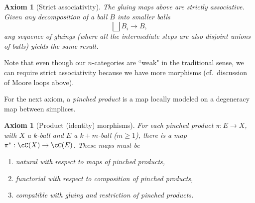 \documentclass{pnastwo}
\newtheorem{axiom}[prop]{Axiom}
\begin{document}
\begin{article}
\begin{axiom}[Strict associativity] \label{nca-assoc}\label{axiom:associativity}
The gluing maps above are strictly associative.
Given any decomposition of a ball $B$ into smaller balls
$$\bigsqcup B_i \to B,$$ 
any sequence of gluings (where all the intermediate steps are also disjoint unions of balls) yields the same result.
\end{axiom}
Note that even though our $n$-categories are ``weak" in the traditional sense, we can require
strict associativity because we have more morphisms (cf.\ discussion of Moore loops above).

For the next axiom, a \emph{pinched product} is a map locally modeled on a degeneracy map between simplices.
\begin{axiom}[Product (identity) morphisms]
\label{axiom:product}
For each pinched product $\pi:E\to X$, with $X$ a $k$-ball and $E$ a $k{+}m$-ball ($m\ge 1$),
there is a map $\pi^*:\cC(X)\to \cC(E)$.
These maps must be
\begin{enumerate}
\item natural with respect to maps of pinched products,
\item functorial with respect to composition of pinched products, 
\item compatible with gluing and restriction of pinched products.
\end{enumerate}


\end{axiom}
\end{article}
\end{document}
